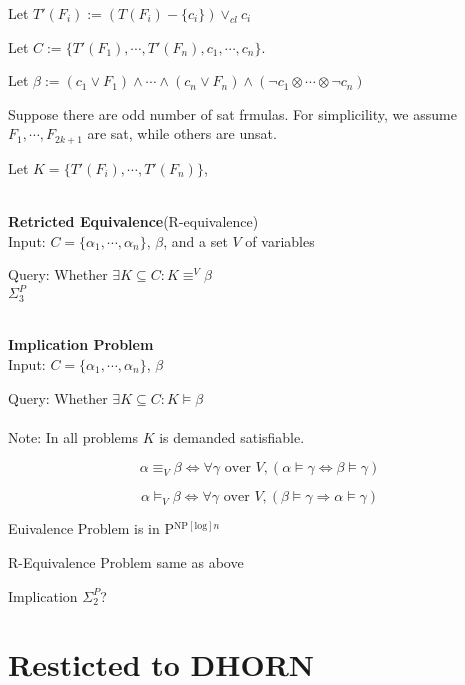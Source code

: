 \documentclass[12pt]{article}
\begin{document}
Let $T'(F_i):=(T(F_i)-\{c_i\})\vee_{cl} c_i$

Let $C:=\{T'(F_1), \cdots, T'(F_n), c_1, \cdots, c_n\}$.


Let $\beta:=( c_1\vee F_1)\wedge\cdots\wedge (c_n\vee F_n)\wedge (\neg c_1\otimes \cdots \otimes \neg c_n)$


Suppose there are odd number of sat frmulas. For simplicility, we assume $F_1, \cdots, F_{2k+1}$ are sat, while others are unsat. 

Let $K=\{T'(F_i),\cdots, T'(F_n)\}$, 



\ \\

{\bf Retricted Equivalence}(R-equivalence)\\

Input: $C=\{\alpha_1,\cdots,\alpha_n\}$, $\beta$, and a set $V$ of variables

Query: Whether $\exists K\subseteq C: K\equiv^V \beta$\\ 

$\Sigma_3^P$

\ \ \\

{\bf Implication Problem}\\

Input: $C=\{\alpha_1,\cdots,\alpha_n\}$, $\beta$

Query: Whether $\exists K\subseteq C: K\models \beta$\\ 


\ \\ 

Note: In all problems $K$ is demanded satisfiable.

$$\alpha \equiv_V \beta \Longleftrightarrow \forall \gamma \mbox{ over } V, (\alpha\models \gamma \Leftrightarrow \beta\models \gamma) $$

$$\alpha \models_V \beta \Longleftrightarrow \forall \gamma \mbox{ over } V, (\beta\models \gamma \Longrightarrow \alpha\models \gamma) $$



Euivalence Problem is in P$^{\text{NP}[\text{log}]n}$

R-Equivalence Problem same as above

Implication  $\Sigma_2^P$?







\section{Resticted to DHORN}
\end{document}
